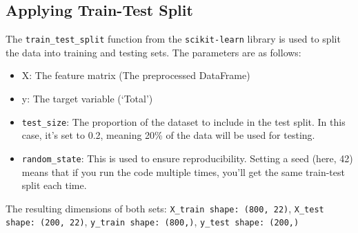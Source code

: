 \subsection{Applying Train-Test Split}

The \verb|train_test_split| function from the \verb|scikit-learn| library is used to split the data into training and testing sets. The parameters are as follows:
\begin{itemize}

\item X: The feature matrix (The preprocessed DataFrame)
\item y: The target variable (‘Total’)
\item \verb|test_size|: The proportion of the dataset to include in the test split. In this case, it's set to 0.2, meaning 20\% of the data will be used for testing.
\item \verb|random_state|: This is used to ensure reproducibility. Setting a seed (here, 42) means that if you run the code multiple times, you'll get the same train-test split each time.

\end{itemize}

The resulting dimensions of both sets:
\verb|X_train shape: (800, 22)|,
\verb|X_test shape: (200, 22)|,
\verb|y_train shape: (800,)|,
\verb|y_test shape: (200,)|



